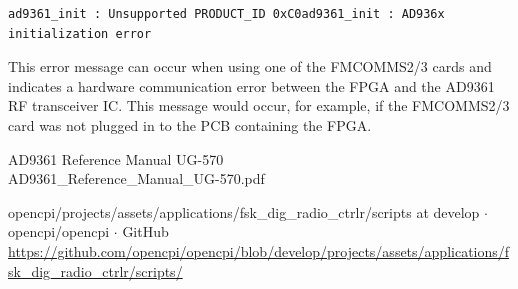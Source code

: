     \begin{lstlisting}
ad9361_init : Unsupported PRODUCT_ID 0xC0ad9361_init : AD936x initialization error
    \end{lstlisting}
    This error message can occur when using one of
    the FMCOMMS2/3 cards and
    indicates
    a hardware communication error between the FPGA and the AD9361 RF
    transceiver
    IC. This message
    would occur, for example, if the FMCOMMS2/3 card
    was not plugged in to the PCB containing the
    FPGA.

\begin{thebibliography}{1}

   AD9361 Reference Manual UG-570\\
    AD9361\_Reference\_Manual\_UG-570.pdf

   opencpi/projects/assets/applications/fsk\_dig\_radio\_ctrlr/scripts at develop $\cdot$ opencpi/opencpi $\cdot$ GitHub\\
    \url{https://github.com/opencpi/opencpi/blob/develop/projects/assets/applications/fsk_dig_radio_ctrlr/scripts/}

\end{thebibliography}


